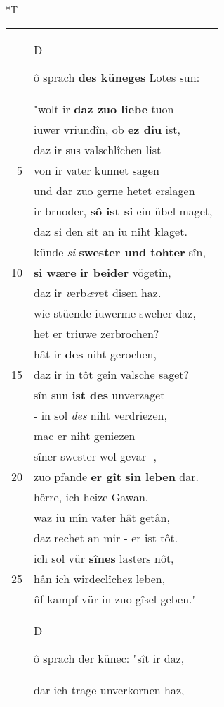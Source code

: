 \documentclass[8pt,a4paper,notitlepage]{article}
\begin{document}
\begin{table}[ht]
\begin{minipage}[t]{0.5\linewidth}
\small
\begin{center}*T
\end{center}
\begin{tabular}{rl}
 & \begin{large}D\end{large}ô sprach \textbf{des küneges} Lotes sun:\\ 
 & "wolt ir \textbf{daz zuo liebe} tuon\\ 
 & iuwer vriundîn, ob \textbf{ez diu} ist,\\ 
 & daz ir sus valschlîchen list\\ 
5 & von ir vater kunnet sagen\\ 
 & und dar zuo gerne hetet erslagen\\ 
 & ir bruoder, \textbf{sô ist si} ein übel maget,\\ 
 & daz si den sit an iu niht klaget.\\ 
 & künde \textit{si} \textbf{swester und tohter} sîn,\\ 
10 & \textbf{si wære} \textbf{ir beider} vögetîn,\\ 
 & daz ir \textit{v}erb\textit{ær}et disen haz.\\ 
 & wie stüende iuwerme sweher daz,\\ 
 & het er triuwe zerbrochen?\\ 
 & hât ir \textbf{des} niht gerochen,\\ 
15 & daz ir in tôt gein valsche saget?\\ 
 & sîn sun \textbf{ist des} unverzaget\\ 
 & - in sol \textit{des} niht verdriezen,\\ 
 & mac er niht geniezen\\ 
 & sîner swester wol gevar -,\\ 
20 & zuo pfande \textbf{er gît} \textbf{sîn leben} dar.\\ 
 & hêrre, ich heize Gawan.\\ 
 & waz iu mîn vater hât getân,\\ 
 & daz rechet an mir - er ist tôt.\\ 
 & ich sol vür \textbf{sînes} lasters nôt,\\ 
25 & hân ich wirdeclîchez leben,\\ 
 & ûf kampf vür in zuo gîsel geben."\\ 
 & \begin{large}D\end{large}ô sprach der künec: "sît ir daz,\\ 
 & dar ich trage unverkornen haz,\\ 

\end{tabular}
\end{minipage}
\end{table}
\end{document}
